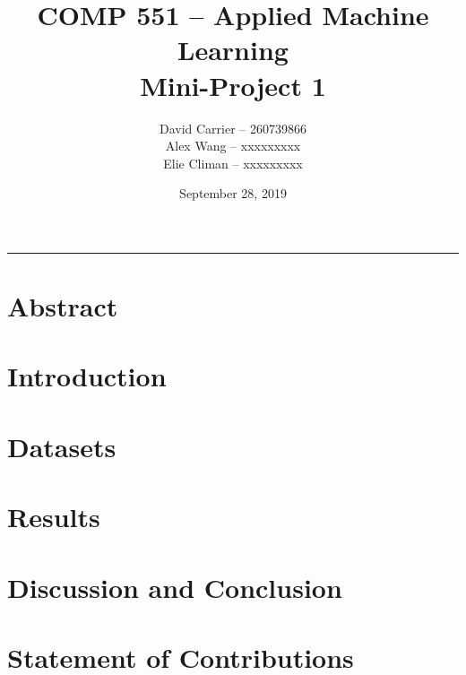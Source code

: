 \documentclass[11pt,letterpaper]{article}
\begin{document}
    \author{David Carrier -- 260739866 \\
        Alex Wang -- xxxxxxxxx \\
        Elie Climan -- xxxxxxxxx}
    \date{September 28, 2019}
    \title{COMP 551 -- Applied Machine Learning \\
    Mini-Project 1}

        \thispagestyle{empty}
        \maketitle
        \vfill
    
    \noindent\rule{0.3\textwidth}{1pt}   
    \section*{Abstract}


    \newpage
    \section{Introduction}
    
    \section{Datasets}
    
    \section{Results}
    
    \section{Discussion and Conclusion}
    
    \section*{Statement of Contributions}
    
\end{document}
